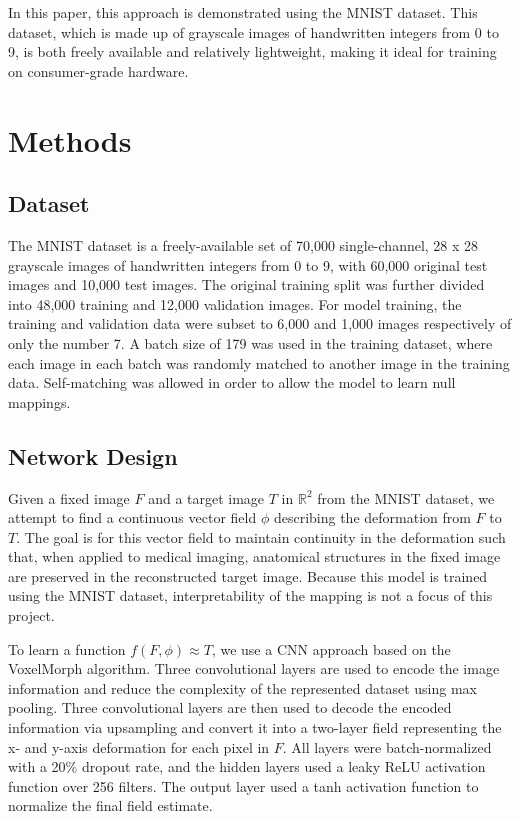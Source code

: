 \documentclass{article} %
\begin{document}
In this paper, this approach is demonstrated using the MNIST dataset. This dataset, which is made up of 
grayscale images of handwritten integers from 0 to 9, is both freely available and relatively lightweight, making it ideal for training on consumer-grade hardware. 

\section{Methods}

\subsection{Dataset}
The MNIST dataset is a freely-available set of 70,000 single-channel, 28 x 28 grayscale images of handwritten integers from 0 to 9, with 60,000 original test images and 10,000 test images. The original training split was further divided into 48,000 training and 12,000 validation images. For model training, the training and validation data were subset to 6,000 and 1,000 images respectively of only the number 7.  A batch size of 179 was used in the training dataset, where each image in each batch was randomly matched to another image in the training data. Self-matching was allowed in order to allow the model to learn null mappings. 

\subsection{Network Design}
Given a fixed image $F$ and a target image $T$ in $\mathbb{R}^2$ from the MNIST dataset, we attempt to find a continuous vector field $\phi$ describing the deformation from $F$ to $T$. The goal is for this vector field to maintain continuity in the deformation such that, when applied to medical imaging, anatomical structures in the fixed image are preserved in the reconstructed target image. Because this model is trained using the MNIST dataset, interpretability of the mapping is not a focus of this project. 

To learn a function $f(F, \phi) \approx T$, we use a CNN approach based on the VoxelMorph algorithm. Three convolutional layers are used to encode the image information and reduce the complexity of the represented dataset using max pooling. Three convolutional layers are then used to decode the encoded information via upsampling and convert it into a two-layer field representing the x- and y-axis deformation for each pixel in $F$. All layers were batch-normalized with a 20\% dropout rate, and the hidden layers used a leaky ReLU activation function over 256 filters. The output layer used a tanh activation function to normalize the final field estimate. 
\end{document}
